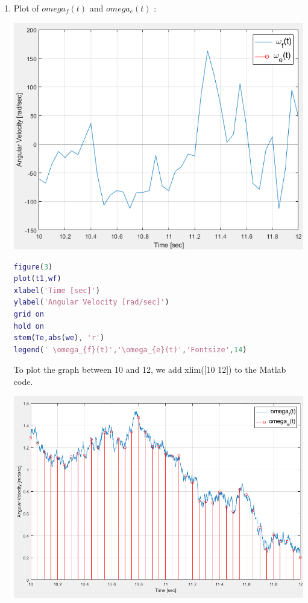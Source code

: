 \documentclass[a4paper,12pt]{article}
\begin{document}
\begin{enumerate}[label={\color{blue}\arabic*)}]
    \item
    Plot of \(omega_f(t)\) and \(omega_e(t)\) :
    \begin{multicols}{2}
        \begin{flushleft}
            \includegraphics[width=0.75\linewidth]{Images/Wf_and_We.png}
            \label{Figure7}
        \end{flushleft}

        \columnbreak

        \begin{lstlisting}[style=Matlab-editor,language=Matlab, basicstyle=\small\ttfamily]
figure(3)
plot(t1,wf)
xlabel('Time [sec]')
ylabel('Angular Velocity [rad/sec]')
grid on
hold on
stem(Te,abs(we), 'r')
legend(' \omega_{f}(t)','\omega_{e}(t)','Fontsize',14)
        \end{lstlisting}
    \end{multicols}

    \newpage

    To plot the graph between 10 and 12, we add xlim([10 12]) to the Matlab code.
    \begin{multicols}{2}
        \begin{flushleft}
            \includegraphics[width=0.75\linewidth]{Images/Wf_and_We_Zoomed.png}
            \label{Figure8}
        \end{flushleft}


\end{multicols}
\end{enumerate}
\end{document}
